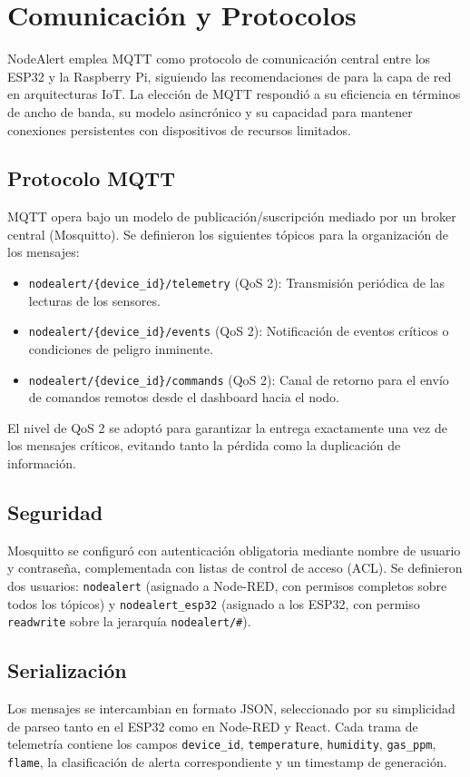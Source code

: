 \documentclass[11pt,a4paper]{article}
\begin{document}
\section{Comunicaci\'on y Protocolos}
NodeAlert emplea MQTT como protocolo de comunicaci\'on central entre los ESP32 y la Raspberry Pi, siguiendo las recomendaciones de \citet{rivera2024} para la capa de red en arquitecturas IoT. La elecci\'on de MQTT respondi\'o a su eficiencia en t\'erminos de ancho de banda, su modelo asincr\'onico y su capacidad para mantener conexiones persistentes con dispositivos de recursos limitados.

\subsection{Protocolo MQTT}
MQTT opera bajo un modelo de publicaci\'on/suscripci\'on mediado por un broker central (Mosquitto). Se definieron los siguientes t\'opicos para la organizaci\'on de los mensajes:
\begin{itemize}
    \item \texttt{nodealert/\{device\_id\}/telemetry} (QoS 2): Transmisi\'on peri\'odica de las lecturas de los sensores.
    \item \texttt{nodealert/\{device\_id\}/events} (QoS 2): Notificaci\'on de eventos cr\'iticos o condiciones de peligro inminente.
    \item \texttt{nodealert/\{device\_id\}/commands} (QoS 2): Canal de retorno para el env\'io de comandos remotos desde el dashboard hacia el nodo.
\end{itemize}

El nivel de QoS 2 se adopt\'o para garantizar la entrega exactamente una vez de los mensajes cr\'iticos, evitando tanto la p\'erdida como la duplicaci\'on de informaci\'on.

\subsection{Seguridad}
Mosquitto se configur\'o con autenticaci\'on obligatoria mediante nombre de usuario y contrase\~na, complementada con listas de control de acceso (ACL). Se definieron dos usuarios: \texttt{nodealert} (asignado a Node-RED, con permisos completos sobre todos los t\'opicos) y \texttt{nodealert\_esp32} (asignado a los ESP32, con permiso \texttt{readwrite} sobre la jerarqu\'ia \texttt{nodealert/\#}).

\subsection{Serializaci\'on}
Los mensajes se intercambian en formato JSON, seleccionado por su simplicidad de parseo tanto en el ESP32 como en Node-RED y React. Cada trama de telemetr\'ia contiene los campos \texttt{device\_id}, \texttt{temperature}, \texttt{humidity}, \texttt{gas\_ppm}, \texttt{flame}, la clasificaci\'on de alerta correspondiente y un timestamp de generaci\'on.
\end{document}
